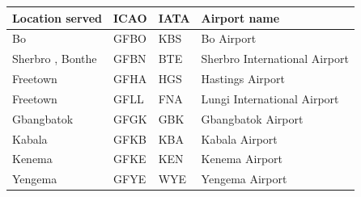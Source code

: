 \documentclass{article}
\begin{document}
\begin{tabular}{llll}
\toprule
Location served & ICAO & IATA & Airport name \\
\midrule
Bo & GFBO & KBS & Bo Airport \\
Sherbro , Bonthe & GFBN & BTE & Sherbro International Airport \\
Freetown & GFHA & HGS & Hastings Airport \\
Freetown & GFLL & FNA & Lungi International Airport \\
Gbangbatok & GFGK & GBK & Gbangbatok Airport \\
Kabala & GFKB & KBA & Kabala Airport \\
Kenema & GFKE & KEN & Kenema Airport \\
Yengema & GFYE & WYE & Yengema Airport \\
\bottomrule
\end{tabular}
\end{document}
